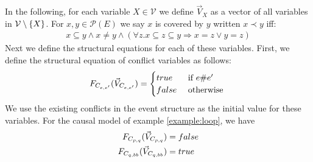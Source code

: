 In the following, for each variable $X \in \mathcal{V}$ we define $\vec V_X$
as a vector of all variables in $\mathcal{V} \setminus \{X\}$.
For $x,y \in \mathcal{P}(E)$ we say $x$ is covered by $y$ written $ x \prec y$ iff:
\begin{align*}
    x \subseteq y \wedge x \neq y \wedge
    (\forall z. x \subseteq z \subseteq y \Rightarrow x = z
    \vee y = z)
\end{align*}
Next we define the structural equations for each of these variables.
First, we define the structural equation of conflict variables as 
follows:
$$
    F_{C_{e,e'}}(\vec V_{C_{e,e'}}) = \begin{cases}
        true  & \text{ if } e \# e' \\
        false & \text{ otherwise }
    \end{cases}
$$
We use the existing conflicts in the event structure as the initial 
value for these variables.
For the causal model of example \ref{example:loop}, we have 
\begin{align*}
    F_{C_{p,q}}(\vec V_{C_{p,q}}) & = false \\
    F_{C_{q,bb}}(\vec V_{C_{q,bb}}) & = true 
\end{align*}

